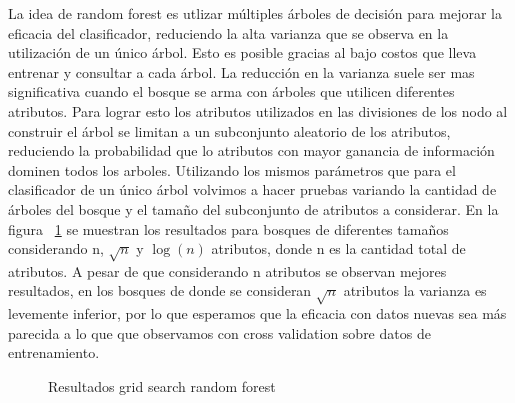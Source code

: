 
La idea de random forest es utlizar múltiples árboles de decisión para mejorar la eficacia del clasificador, reduciendo la alta varianza que se observa en la utilización de un único árbol. Esto es posible gracias al bajo costos que lleva entrenar y consultar a cada árbol. 
 La reducción en la varianza suele ser mas significativa cuando el bosque se arma con árboles que utilicen diferentes atributos. Para lograr esto los atributos utilizados en las divisiones de los nodo al construir el árbol se limitan a un subconjunto aleatorio de los atributos, reduciendo la probabilidad que lo atributos con mayor ganancia de información dominen todos los arboles. 
Utilizando los mismos parámetros que para el clasificador de un único árbol volvimos a hacer pruebas variando la cantidad de árboles del bosque y el tamaño del subconjunto de atributos a considerar. En la figura ~\ref{fig:forest_f05_en_funcion_de_cantidad_de_arboles} se muestran los resultados para bosques de diferentes tamaños considerando n, $\sqrt{n}$ y $\log(n)$ atributos, donde n es la cantidad total de atributos. A pesar de que considerando n atributos se observan mejores resultados, en los bosques de donde se consideran $\sqrt{n}$ atributos  la varianza es levemente inferior, por lo que esperamos que la eficacia con datos nuevas sea más parecida a lo que que observamos con cross validation sobre datos de entrenamiento. 

\begin{figure}[H]
\begin{center}
\caption{Resultados grid search random forest}
\label{fig:forest_f05_en_funcion_de_cantidad_de_arboles}
\end{center}
\end{figure}